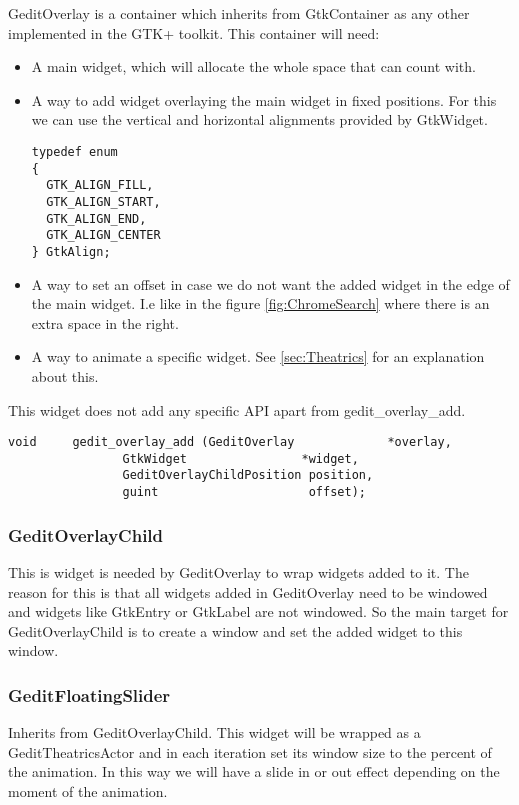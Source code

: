 GeditOverlay is a container which inherits from GtkContainer as any other implemented in the GTK+ toolkit. This container will need:
\begin{itemize}
  \item A main widget, which will allocate the whole space that can count with.
  \item A way to add widget overlaying the main widget in fixed positions. For this we can use the vertical and horizontal alignments provided by GtkWidget.
\begin{lstlisting}[style=GObject]
typedef enum
{
  GTK_ALIGN_FILL,
  GTK_ALIGN_START,
  GTK_ALIGN_END,
  GTK_ALIGN_CENTER
} GtkAlign;
\end{lstlisting}
  \item A way to set an offset in case we do not want the added widget in the edge of the main widget. I.e like in the figure \ref{fig:ChromeSearch} where there is an extra space in the right.
  \item A way to animate a specific widget. See \ref{sec:Theatrics} for an explanation about this.
\end{itemize}

This widget does not add any specific API apart from gedit\_overlay\_add.

\begin{lstlisting}[style=GObject]
void	 gedit_overlay_add (GeditOverlay             *overlay,
			    GtkWidget                *widget,
			    GeditOverlayChildPosition position,
			    guint                     offset);
\end{lstlisting}

\subsubsection{GeditOverlayChild}

This is widget is needed by GeditOverlay to wrap widgets added to it. The reason for this is that all widgets added in GeditOverlay need to be windowed and widgets like GtkEntry or GtkLabel are not windowed. So the main target for GeditOverlayChild is to create a window and set the added widget to this window.

\subsubsection{GeditFloatingSlider}

Inherits from GeditOverlayChild. This widget will be wrapped as a GeditTheatricsActor and in each iteration set its window size to the percent of the animation. In this way we will have a slide in or out effect depending on the moment of the animation.

